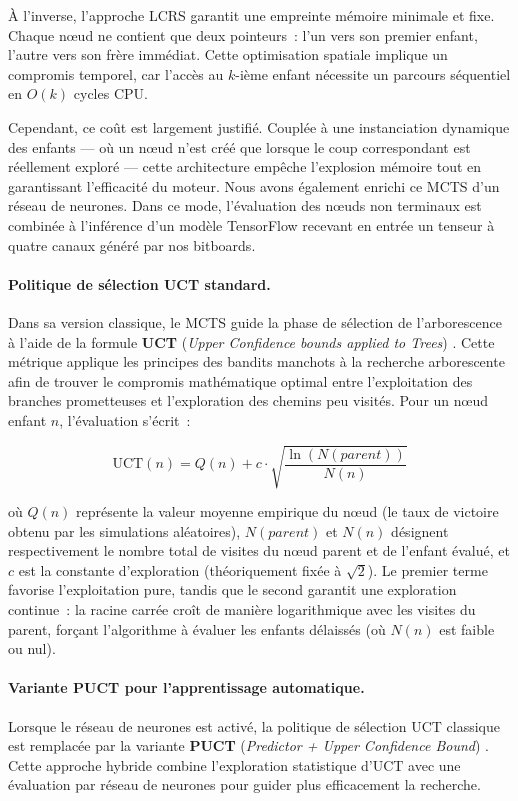\documentclass[a4paper]{article}
\begin{document}
À l'inverse, l'approche LCRS garantit une empreinte mémoire minimale et fixe. Chaque nœud ne contient que deux pointeurs~: l'un vers son premier enfant, l'autre vers son frère immédiat. Cette optimisation spatiale implique un compromis temporel, car l'accès au $k$-ième enfant nécessite un parcours séquentiel en $O(k)$ cycles CPU. 

Cependant, ce coût est largement justifié. Couplée à une instanciation dynamique des enfants --- où un nœud n'est créé que lorsque le coup correspondant est réellement exploré --- cette architecture empêche l'explosion mémoire tout en garantissant l'efficacité du moteur.
Nous avons également enrichi ce MCTS d'un réseau de neurones. Dans ce mode,
l'évaluation des nœuds non terminaux est combinée à l'inférence d'un modèle 
TensorFlow recevant en entrée un tenseur à quatre canaux généré par nos bitboards.

\paragraph{Politique de sélection UCT standard.}
Dans sa version classique, le MCTS guide la phase de sélection de l'arborescence à l'aide de la formule \textbf{UCT} (\textit{Upper Confidence bounds applied to Trees}) \cite{Kocsis2006}. Cette métrique applique les principes des bandits manchots à la recherche arborescente afin de trouver le compromis mathématique optimal entre l'exploitation des branches prometteuses et l'exploration des chemins peu visités. Pour un nœud enfant $n$, l'évaluation s'écrit~:

$$ \text{UCT}(n) = Q(n) + c \cdot \sqrt{\frac{\ln(N(parent))}{N(n)}} $$

où $Q(n)$ représente la valeur moyenne empirique du nœud (le taux de victoire obtenu par les simulations aléatoires), $N(parent)$ et $N(n)$ désignent respectivement le nombre total de visites du nœud parent et de l'enfant évalué, et $c$ est la constante d'exploration (théoriquement fixée à $\sqrt{2}$). Le premier terme favorise l'exploitation pure, tandis que le second garantit une exploration continue~: la racine carrée croît de manière logarithmique avec les visites du parent, forçant l'algorithme à évaluer les enfants délaissés (où $N(n)$ est faible ou nul).

\paragraph{Variante PUCT pour l'apprentissage automatique.} 
Lorsque le réseau de neurones est activé, la politique de sélection UCT classique est remplacée par la variante \textbf{PUCT} (\textit{Predictor + Upper Confidence Bound}) \cite{Cazenave2022}. Cette approche hybride combine l'exploration statistique d'UCT avec une évaluation par réseau de neurones pour guider plus efficacement la recherche.
\end{document}
